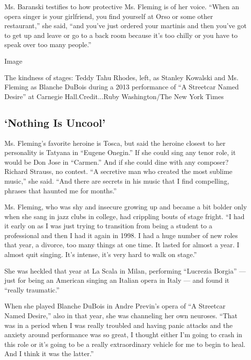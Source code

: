 Ms. Baranski testifies to how protective Ms. Fleming is of her voice.
``When an opera singer is your girlfriend, you find yourself at Orso or
some other restaurant,'' she said, ``and you've just ordered your
martinis and then you've got to get up and leave or go to a back room
because it's too chilly or you have to speak over too many people.''

Image

The kindness of stages: Teddy Tahu Rhodes, left, as Stanley Kowalski and
Ms. Fleming as Blanche DuBois during a 2013 performance of ``A Streetcar
Named Desire'' at Carnegie Hall.Credit...Ruby Washington/The New York
Times

\hypertarget{nothing-is-uncool}{%
\subsection{`Nothing Is Uncool'}\label{nothing-is-uncool}}

Ms. Fleming's favorite heroine is Tosca, but said the heroine closest to
her personality is Tatyana in ``Eugene Onegin.'' If she could sing any
tenor role, it would be Don Jose in ``Carmen.'' And if she could dine
with any composer? Richard Strauss, no contest. ``A secretive man who
created the most sublime music,'' she said. ``And there are secrets in
his music that I find compelling, phrases that haunted me for months.''

Ms. Fleming, who was shy and insecure growing up and became a bit bolder
only when she sang in jazz clubs in college, had crippling bouts of
stage fright. ``I had it early on as I was just trying to transition
from being a student to a professional and then I had it again in 1998.
I had a huge number of new roles that year, a divorce, too many things
at one time. It lasted for almost a year. I almost quit singing. It's
intense, it's very hard to walk on stage.''

She was heckled that year at La Scala in Milan, performing ``Lucrezia
Borgia'' --- just for being an American singing an Italian opera in
Italy --- and found it ``really traumatic.''

When she played Blanche DuBois in Andre Previn's opera of ``A Streetcar
Named Desire,'' also in that year, she was channeling her own neuroses.
``That was in a period when I was really troubled and having panic
attacks and the anxiety around performance was so great, I thought
either I'm going to crash in this role or it's going to be a really
extraordinary vehicle for me to begin to heal. And I think it was the
latter.''


